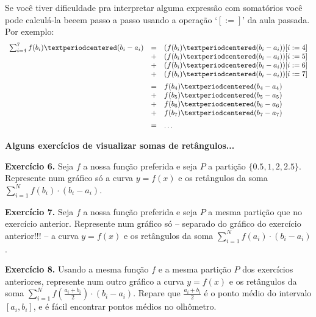 \documentclass[oneside,12pt]{article}
\begin{document}
Se você tiver dificuldade pra interpretar alguma expressão com
somatórios você pode calculá-la beeem passo a passo usando a operação
`$[:=]$' da aula passada. Por exemplo:
%
$$\scalebox{0.90}{$
  \begin{array}{rcl}
  \sum_{i=4}^7 f(b_i)·(b_i-a_i)
     &=& (f(b_i)·(b_i-a_i))[i:=4] \\
     &+& (f(b_i)·(b_i-a_i))[i:=5] \\
     &+& (f(b_i)·(b_i-a_i))[i:=6] \\
     &+& (f(b_i)·(b_i-a_i))[i:=7] \\[5pt]
     &=&  f(b_4)·(b_4-a_4) \\
     &+&  f(b_5)·(b_5-a_5) \\
     &+&  f(b_6)·(b_6-a_6) \\
     &+&  f(b_7)·(b_7-a_7) \\[5pt]
     &=& \ldots \\
  \end{array}
  $}
$$



\newpage


{\bf Alguns exercícios de visualizar somas de retângulos...}

\ssk

{\bf Exercício 6.} Seja $f$ a nossa função preferida e seja $P$ a
partição $\{0.5,1,2,2.5\}$. Represente num gráfico só a curva $y=f(x)$
e os retângulos da soma $\sum_{i=1}^N f(b_i)·(b_i-a_i)$.

\msk

{\bf Exercício 7.} Seja $f$ a nossa função preferida e seja $P$ a
mesma partição que no exercício anterior. Represente num gráfico só --
separado do gráfico do exercício anterior!!! -- a curva $y=f(x)$ e os
retângulos da soma $\sum_{i=1}^N f(a_i)·(b_i-a_i)$.

\msk

{\bf Exercício 8.} Usando a mesma função $f$ e a mesma partição $P$
dos exercícios anteriores, represente num outro gráfico a curva
$y=f(x)$ e os retângulos da soma $\sum_{i=1}^N
f(\frac{a_i+b_i}{2})·(b_i-a_i)$. Repare que $\frac{a_i+b_i}{2}$ é o
ponto médio do intervalo $[a_i,b_i]$, e é fácil encontrar pontos
médios no olhômetro.

\newpage

\end{document}
